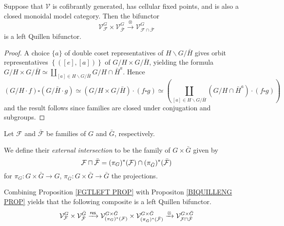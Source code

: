 \documentclass[a4paper,10pt]{article}%
\begin{document}
\begin{proposition}\label{BIQUILLENG PROP}
	Suppose that $\mathcal{V}$ is cofibrantly generated, has cellular fixed points, and is also a closed monoidal model category. 	
	Then the bifunctor
\[
	\mathcal{V}^G_{\mathcal{F}}
		\times
	\mathcal{V}^G_{\bar{\mathcal{F}}}
		\xrightarrow{\otimes}
	\mathcal{V}^G_{\mathcal{F} \cap \bar{\mathcal{F}}}
\]
	is a left Quillen bifunctor.
\end{proposition}


\begin{proof}
	A choice $\{a\}$ of double coset representatives
	of $H \backslash G /\bar{H}$
	gives orbit representatives
	$\left\{([e],[a])\right\}$ of
	$G/H \times G/\bar{H}$,
	yielding the formula
	$G/H \times G/\bar{H}
	\simeq 
	\coprod_{[a]\in H \backslash G /\bar{H}}
	{G/H\cap \bar{H}^a}
	$.
%
	Hence	
\[
	\left(G/H \cdot f\right) \square \left(G/\bar{H} \cdot g\right)
		\simeq
	\left(G/H \times G/\bar{H}\right) \cdot \left(f \square g\right)
		\simeq
	\left(
		\coprod_{[a]\in H \backslash G /\bar{H}}
		{\left(G/H\cap \bar{H}^a\right)} \cdot (f \square g)
	\right)
\]
and the result follows since families are closed under conjugation and subgroups.
\end{proof}


\begin{definition}\label{EXTERINT DEF}
Let $\mathcal{F}$ and $\bar{\mathcal{F}}$ be families of $G$ and $\bar{G}$, respectively.

We define their \textit{external intersection} to be the 
family of $G \times \bar{G}$ given by
\[
	\mathcal{F} \sqcap \bar{\mathcal{F}}
=
	(\pi_{G})^{\**} (\mathcal{F}) 
		\cap
	(\pi_{\bar{G}})^{\**} (\bar{\mathcal{F}})
\]
for 
$\pi_G \colon G \times \bar{G} \to G$,
$\pi_{\bar{G}} \colon G \times \bar{G} \to \bar{G}$
the projections.
\end{definition}


\begin{remark}
	Combining Proposition \ref{FGTLEFT PROP} 
	with Propositon \ref{BIQUILLENG PROP} yields that
	the following composite is a left Quillen bifunctor.
\begin{equation}\label{EXTERINTADJ EQ}
	\mathcal{V}^{G}_{\mathcal{F}}
		\times
	\mathcal{V}^{\bar{G}}_{\bar{\mathcal{F}}}
		\xrightarrow{\mathsf{res}}
	\mathcal{V}^{G \times \bar{G}}_{
	(\pi_G)^{\**}(\mathcal{F})}
		\times
	\mathcal{V}^{G \times \bar{G}}_{
	(\pi_{\bar{G}})^{\**}(\bar{\mathcal{F}})}
		\xrightarrow{\otimes}
	\mathcal{V}^{G \times \bar{G}}_{
	\mathcal{F} \sqcap \bar{\mathcal{F}}}
\end{equation}
\end{remark}
\end{document}
